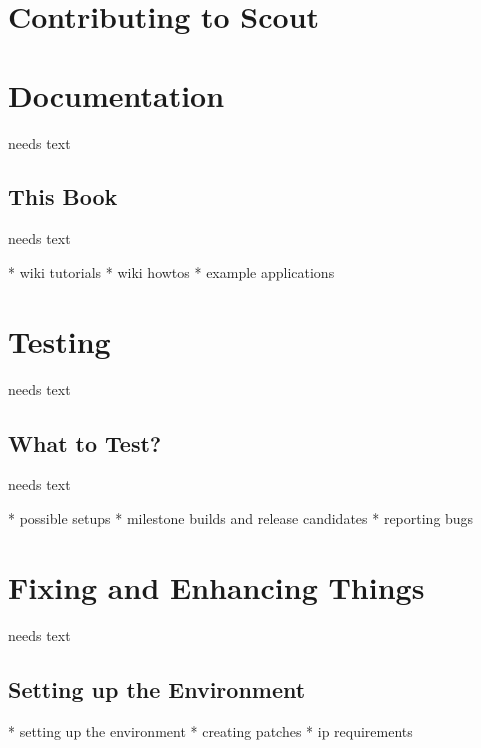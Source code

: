 \documentclass[a4paper,10pt,twoside]{book}
\begin{document}
  \sloppy
\fi


\chapter{Contributing to Scout}

\chapter{Documentation}
needs text

\section{This Book}
needs text

  * wiki tutorials
  * wiki howtos
  * example applications

\chapter{Testing}
needs text

\section{What to Test?}
needs text

  * possible setups
  * milestone builds and release candidates
  * reporting bugs
  
\chapter{Fixing and Enhancing Things}
needs text

\section{Setting up the Environment}
  * setting up the environment
  * creating patches
  * ip requirements


\ifx\wholebook\relax\else
   
   
\end{document}
